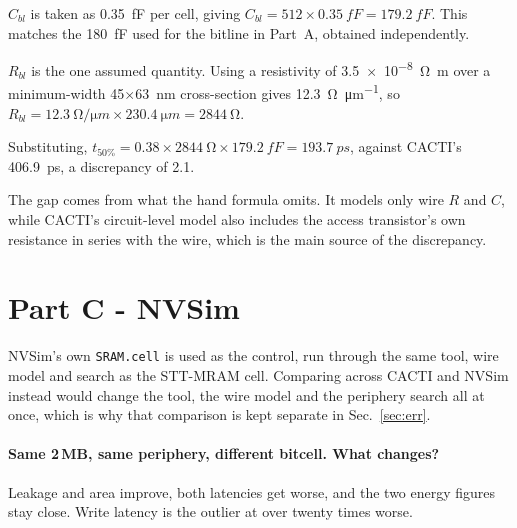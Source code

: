 \documentclass[9pt,a4paper]{extarticle}
\begin{document}
$C_{bl}$ is taken as \SI{0.35}{fF} per cell, giving
$C_{bl} = 512 \times \SI{0.35}{fF} = \SI{179.2}{fF}$. This matches the
\SI{180}{fF} used for the bitline in Part~A, obtained independently.

$R_{bl}$ is the one assumed quantity. Using a resistivity of
\SI{3.5e-8}{\ohm\metre} over a minimum-width \SI{45}{}$\times$\SI{63}{nm}
cross-section gives \SI{12.3}{\ohm\per\micro m}, so
$R_{bl} = \SI{12.3}{\ohm\per\micro m} \times \SI{230.4}{\micro m}
= \SI{2844}{\ohm}$.

Substituting,
$t_{50\%} = 0.38 \times \SI{2844}{\ohm} \times \SI{179.2}{fF} =
\SI{193.7}{ps}$, against CACTI's \SI{406.9}{ps}, a discrepancy of
\SI{2.1}{\times}.

The gap comes from what the hand formula omits. It models only wire $R$
and $C$, while CACTI's circuit-level model also includes the access
transistor's own resistance in series with the wire, which is the main
source of the discrepancy.






\section{Part C - NVSim}
\label{sec:c}

NVSim's own \texttt{SRAM.cell} is used as the control, run through the
same tool, wire model and search as the STT-MRAM cell. Comparing across
CACTI and NVSim instead would change the tool, the wire model and the
periphery search all at once, which is why that comparison is kept
separate in Sec.~\ref{sec:err}.

\paragraph{Same 2\,MB, same periphery, different bitcell. What changes?}

Leakage and area improve, both latencies get worse, and the two energy
figures stay close. Write latency is the outlier at over twenty times
worse.
\end{document}
